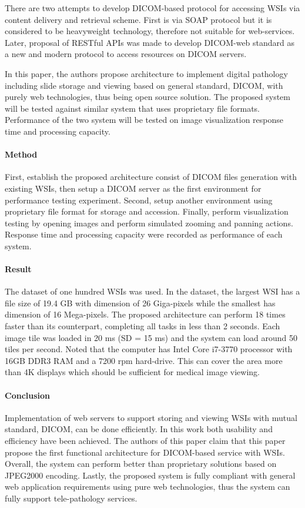 \documentclass{article}
\begin{document}
There are two attempts to develop DICOM-based protocol for accessing WSIs via content delivery and retrieval scheme. First is via SOAP protocol but it is considered to be heavyweight technology, therefore not suitable for web-services. Later, proposal of RESTful APIs was made to develop DICOM-web standard as a new and modern protocol to access resources on DICOM servers. 

In this paper, the authors propose architecture to implement digital pathology including slide storage and viewing based on general standard, DICOM, with purely web technologies, thus being open source solution. The proposed system will be tested against similar system that uses proprietary file formats. Performance of the two system will be tested on image visualization response time and processing capacity. 

\paragraph{Method}
First, establish the proposed architecture consist of DICOM files generation with existing WSIs, then setup a DICOM server as the first environment for performance testing experiment. Second, setup another environment using proprietary file format for storage and accession. Finally, perform visualization testing by opening images and perform simulated zooming and panning actions. Response time and processing capacity were recorded as performance of each system. 

\paragraph{Result}
The dataset of one hundred WSIs was used. In the dataset, the largest WSI has a file size of 19.4 GB with dimension of 26 Giga-pixels while the smallest has dimension of 16 Mega-pixels. The proposed architecture can perform 18 times faster than its counterpart, completing all tasks in less than 2 seconds. Each image tile was loaded in 20 ms (SD = 15 ms) and the system can load around 50 tiles per second. Noted that the computer has Intel Core i7-3770 processor with 16GB DDR3 RAM and a 7200 rpm hard-drive. This can cover the area more than 4K displays which should be sufficient for medical image viewing. 

\paragraph{Conclusion}
Implementation of web servers to support storing and viewing WSIs with mutual standard, DICOM, can be done efficiently. In this work both usability and efficiency have been achieved. The authors of this paper claim that this paper propose the first functional architecture for DICOM-based service with WSIs. Overall, the system can perform better than proprietary solutions based on JPEG2000 encoding. Lastly, the proposed system is fully compliant with general web application requirements using pure web technologies, thus the system can fully support tele-pathology services. 
\end{document}
